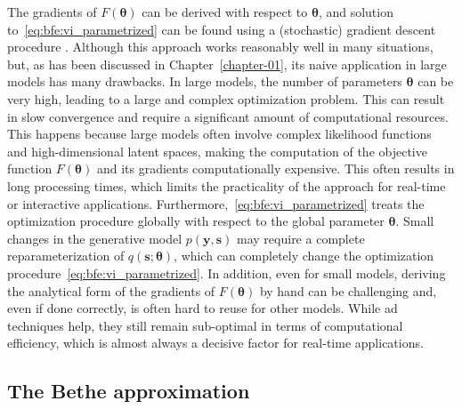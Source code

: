 The gradients of $F(\bm{\theta})$ can be derived with respect to $\bm{\theta}$,
and solution to~\eqref{eq:bfe:vi_parametrized} can be found using a (stochastic) gradient descent
procedure \citep{hoffman_stochastic_2012, hoffman_structured_2014, archer_black_2015}.
Although this approach works reasonably well in many situations, but, as has been discussed in Chapter~\ref{chapter-01}, its naive application in large models has many drawbacks.
In large models, the number of parameters $\bm{\theta}$ can be very high, leading to a large
and complex optimization problem.
This can result in slow convergence and require a significant amount of computational
resources.
This happens because large models often involve complex likelihood functions and
high-dimensional latent spaces, making the computation of the objective function
$F(\bm{\theta})$ and its gradients computationally expensive.
This often results in long processing times, which limits the practicality of the approach for
real-time or interactive applications.
Furthermore,~\eqref{eq:bfe:vi_parametrized} treats the optimization procedure globally with
respect to the global parameter $\bm{\theta}$.
Small changes in the generative model $p(\bm{y}, \bm{s})$ may require a complete
reparameterization of $q(\bm{s}; \bm{\theta})$, which can completely change the optimization
procedure~\eqref{eq:bfe:vi_parametrized}.
In addition, even for small models, deriving the analytical form of the gradients of
$F(\bm{\theta})$ by hand can be challenging and, even if done correctly, is often hard to reuse for other models.
While \ac{ad} techniques help, they still remain sub-optimal in terms of
computational efficiency, which is almost always a decisive factor for real-time applications.

\subsection{The Bethe approximation}

